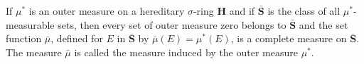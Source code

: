 If $\mu^*$ is an outer measure on a hereditary $\sigma$-ring $\mathbf{H}$ and if $\bar{\mathbf{S}}$ is the class of all $\mu^*$-measurable sets, then every set of outer measure zero belongs to $\bar{\mathbf{S}}$ and the set function $\bar{\mu}$, defined for $E$ in $\bar{\mathbf{S}}$ by $\bar{\mu}(E) = \mu^*(E)$, is a complete measure on $\bar{\mathbf{S}}$. The measure $\bar{\mu}$ is called the measure induced by the outer measure $\mu^*$.
